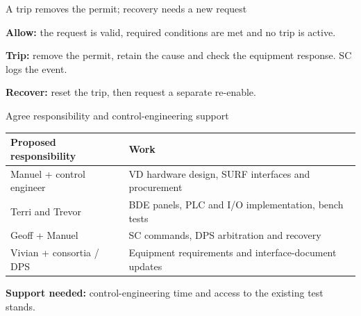 \documentclass[aspectratio=169,11pt]{beamer}
\begin{document}
\DpsConnectionCollection

\begin{frame}{A trip removes the permit; recovery needs a new request}
\centering
{}\par\bigskip
\raggedright

\textbf{Allow:} the request is valid, required conditions are met and no trip is active.\par\medskip
\textbf{Trip:} remove the permit, retain the cause and check the equipment response. SC logs the event.\par\medskip
\textbf{Recover:} reset the trip, then request a separate re-enable.\par\bigskip
\raggedright{}
\end{frame}



\appendix
\DpsBackupsTransition

\begin{frame}{Agree responsibility and control-engineering support}
\renewcommand{\arraystretch}{1.45}
\begin{tabularx}{\textwidth}{@{}>{\RaggedRight\arraybackslash}p{4.1cm}>{\RaggedRight\arraybackslash}X@{}}
\toprule
\textbf{Proposed responsibility} & \textbf{Work}\\\midrule
Manuel + control engineer & VD hardware design, SURF interfaces and procurement\\
Terri and Trevor & BDE panels, PLC and I/O implementation, bench tests\\
Geoff + Manuel & SC commands, DPS arbitration and recovery\\
Vivian + consortia / DPS & Equipment requirements and interface-document updates\\
\bottomrule
\end{tabularx}\par\bigskip
\textbf{Support needed:} control-engineering time and access to the existing test stands.
\end{frame}


\end{document}
